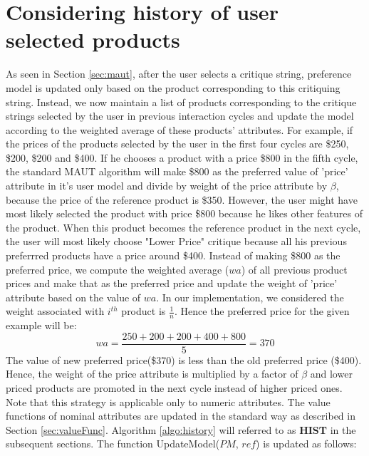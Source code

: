 \section{Considering history of user selected products}
\label{sec:hist}
As seen in Section \ref{sec:maut}, after the user selects a critique string, preference model is updated only based on the product corresponding to this critiquing string.
Instead, we now maintain a list of products corresponding to the critique strings selected by the user in previous interaction cycles and update the model according to the weighted average of these products' attributes.
For example, if the prices of the products selected by the user in the first four cycles are \$250, \$200, \$200 and \$400.
If he chooses a product with a price \$800 in the fifth cycle, the standard MAUT algorithm will make \$800 as the preferred value of 'price' attribute in it's user model and divide by weight of the price attribute by $\beta$, because the price of the reference product is \$350.
However, the user might have most likely selected the product with price \$800 because he likes other features of the product.
When this product becomes the reference product in the next cycle, the user will most likely choose "Lower Price" critique because all his previous preferrred products have a price around \$400.
Instead of making \$800 as the preferred price, we compute the weighted average ($wa$) of all previous product prices and make that as the preferred price and update the weight of 'price' attribute based on the value of $wa$.
In our implementation, we considered the weight associated with $i^{th}$ product is $\frac{1}{n}$. 
Hence the preferred price for the given example will be:
\begin{equation}
wa = \frac{250+200+200+400+800} {5} = 370
\end{equation}
The value of new preferred price(\$370) is less than the old preferred price (\$400).
Hence, the weight of the price attribute is multiplied by a factor of $\beta$ and lower priced products are promoted in the next cycle instead of higher priced ones.
Note that this strategy is applicable only to numeric attributes.
The value functions of nominal attributes are updated in the standard way as described in Section \ref{sec:valueFunc}.
Algorithm \ref{algo:history} will referred to as \textbf{HIST} in the subsequent sections.
The function UpdateModel($PM$, $ref$) is updated as follows:


